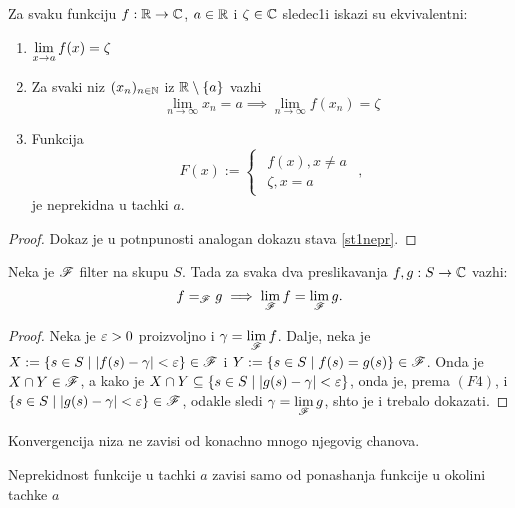 \documentclass[../maing.tex]{subfiles}
\begin{document}
    \begin{st}\label{st1nepr} 
        Za svaku funkciju $f:\mathbb{R} \to \mathbb{C}$, $a\in \mathbb{R}$ i $\zeta \in \mathbb{C}$ sledec1i iskazi su ekvivalentni:
    \begin{enumerate}
        \item $\displaystyle{\lim_{x\to a}f(x)=\zeta}$
        \item Za svaki niz $(x_n)_{n\in \mathbb{N}}$ iz $\mathbb{R}\setminus\{a\}$ vazhi \[\lim_{n \to \infty}x_n=a \implies \lim_{n \to \infty}f(x_n)=\zeta \]
        \item Funkcija \[
                F(x):=
            \begin{cases}
                \begin{aligned}
                    f(x), x\neq a\\
                \zeta, x=a

                    \end{aligned}
                            \end{cases},
            \]
            je neprekidna u tachki $a$.
        \end{enumerate}
    
    
    \end{st}
    \begin{proof}
        Dokaz je u potnpunosti analogan dokazu stava \ref{st1nepr}.
    \end{proof}
    \begin{tvr}
        Neka je $\mathscr{F}$ filter na skupu $S$. Tada za svaka dva preslikavanja $f,g : S\to \mathbb{C}$ vazhi: \[f=_{\mathscr{F}} g\implies \lim_{\mathscr{F}} f=\lim_{\mathscr{F}} g.\]
    \end{tvr}

    \begin{proof}
        Neka je $\varepsilon>0$ proizvoljno i $\displaystyle{\gamma=\lim_{\mathscr{F}}f}$. Dalje, neka je $X:=\{s\in S\mid |f(s)-\gamma|<\varepsilon\}\in \mathscr{F}$ i $Y:=\{s \in S \mid f(s)=g(s)\} \in \mathscr{F}$. 
	Onda je $X \cap Y \in \mathscr{F}$, a kako je $X\cap Y\subseteq \{s \in S \mid |g(s)-\gamma|<\varepsilon\}$, onda je, prema $(F4)$, i $ \{s \in S \mid |g(s)-\gamma|<\varepsilon\}\in \mathscr{F}$,
	odakle sledi $\gamma=\displaystyle{\lim_{\mathscr{F}}g}$, shto je i trebalo dokazati.
    \end{proof}

    \begin{posl}

        Konvergencija niza ne zavisi od konachno mnogo njegovig chanova.

    \end{posl}
    \begin{posl}
        Neprekidnost funkcije u tachki $a$ zavisi samo od ponashanja funkcije u okolini tachke $a$
    \end{posl}
\end{document}
